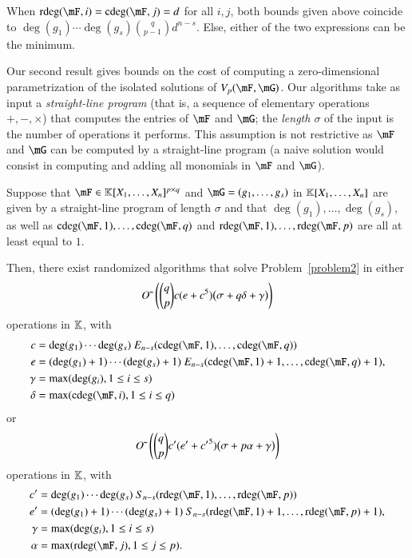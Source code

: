 When $\rdeg(\mF,i)=\cdeg(\mF,j)=d$ for all $i,j$, both bounds given above
coincide to $\deg(g_1) \cdots \deg(g_s) {q \choose {p-1}} d^{n-s}$. Else,
either of the two expressions can be the minimum.

Our second result gives bounds on the cost of computing a
zero-dimensional paramet\-rization of the isolated solutions of
$\VpFG{p}{\mF}{\mG}$. Our
algorithms take as input a \emph{straight-line program} (that is, a
sequence of elementary operations $+, -, \times$) that computes the
entries of $\mF$ and $\mG$; the
\emph{length $\sigma$} of the input is the number of operations it
performs. This assumption is not restrictive as $\mF$
and $\mG$ can be computed by a straight-line program (a
naive solution would consist in computing and adding all monomials in
$\mF$ and $\mG$).

\begin{theorem}\label{theo:2}
  Suppose that $\mF \in \KK[X_1,\dots,X_n]^{p \times q}$ and 
  $\mG=(g_1,\dots,g_s)$ in $\mathbb{K}[X_1,\dots,X_n]$ are given by a straight-line
  program of length $\sigma$ and that $\deg(g_1),\dots,\deg(g_s)$, as well
  as $\cdeg(\mF,1), \ldots, \cdeg(\mF,q)$ and $\rdeg(\mF,1), \ldots,
  \rdeg(\mF,p)$ are all at least equal to $1$.

  Then, there exist randomized algorithms that solve
  Problem~\eqref{problem2} in either
   $${O}{\,\tilde{ }\,}\left (
     {q \choose p} c(e+c^5 )\big(\sigma + q \delta + \gamma  \big )
   \right)$$
  operations in $\mathbb{K}$, with
  \begin{align*}
    c&=\deg(g_1)\cdots\deg(g_s)\ E_{n-s}(\cdeg(\mF,1), \ldots, \cdeg(\mF,q))\\
    e&=(\deg(g_1)+1)\cdots(\deg(g_s)+1)\ E_{n-s}(\cdeg(\mF,1)+1, \ldots, \cdeg(\mF,q)+1),\\
    \gamma&= \max(\deg(g_i), 1\leq i \leq s)\\
    \delta &= \max(\cdeg(\mF,i), 1\leq i \leq q)
  \end{align*}
  or 
   $${O}{\,\tilde{ }\,}\left (
     {q \choose p} c'(e'+{c'}^5 )\big(\sigma + p \alpha  +\gamma \big )
   \right)$$
  operations in $\mathbb{K}$, with 
\begin{align*}
  c'&=\deg(g_1)\cdots\deg(g_s)\ S_{n-s}(\rdeg(\mF,1), \ldots, \rdeg(\mF,p))\\
  e'&=(\deg(g_1)+1)\cdots(\deg(g_s)+1)\ S_{n-s}(\rdeg(\mF,1)+1, \ldots, \rdeg(\mF,p)+1),\\
    \gamma&= \max(\deg(g_i), 1\leq i \leq s)\\
    \alpha &= \max(\rdeg(\mF,j), 1\leq j \leq p).
\end{align*}
\end{theorem}

